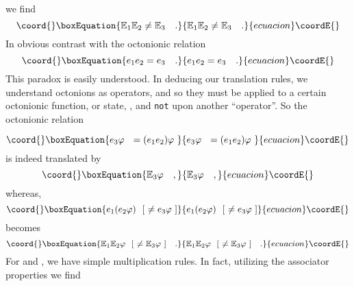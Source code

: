 \documentclass[a4paper,12pt]{book}
\begin{document}
we find 
\begin{equation}\coord{}\boxEquation{
\Bbb{E}_{1}\Bbb{E}_{2}\neq \Bbb{E}_{3}\quad .
}{
\Bbb{E}_{1}\Bbb{E}_{2}\neq \Bbb{E}_{3}\quad .
}{ecuacion}\coordE{}\end{equation}
In obvious contrast with the octonionic relation 
\begin{equation}\coord{}\boxEquation{
e_{1}e_{2}=e_{3}\quad .
}{
e_{1}e_{2}=e_{3}\quad .
}{ecuacion}\coordE{}\end{equation}
This paradox is easily understood. In deducing our translation rules, we
understand octonions as operators, and so they must be applied to a certain
octonionic function, or state, \myHighlight{$\varphi $}\coordHE{}, and \texttt{not} upon another
``operator''. So the octonionic relation

\begin{equation}\coord{}\boxEquation{
e_{3}\varphi ~~=(e_{1}e_{2})\varphi ~
}{
e_{3}\varphi ~~=(e_{1}e_{2})\varphi ~
}{ecuacion}\coordE{}\end{equation}
is indeed translated by 
\begin{equation}\coord{}\boxEquation{
\Bbb{E}_{3}\varphi \quad ,
}{
\Bbb{E}_{3}\varphi \quad ,
}{ecuacion}\coordE{}\end{equation}
whereas, 
\begin{equation}\coord{}\boxEquation{
e_{1}(e_{2}\varphi )~~[~\neq e_{3}\varphi ~]
}{
e_{1}(e_{2}\varphi )~~[~\neq e_{3}\varphi ~]
}{ecuacion}\coordE{}\end{equation}
becomes 
\begin{equation}\coord{}\boxEquation{
\Bbb{E}_{1}\Bbb{E}_{2}\varphi ~~[~\neq \Bbb{E}_{3}\varphi ~]\quad .
}{
\Bbb{E}_{1}\Bbb{E}_{2}\varphi ~~[~\neq \Bbb{E}_{3}\varphi ~]\quad .
}{ecuacion}\coordE{}\end{equation}
For \coordHE{} and \coordHE{}, we have simple multiplication rules. In fact,
utilizing the associator properties we find
\end{document}
